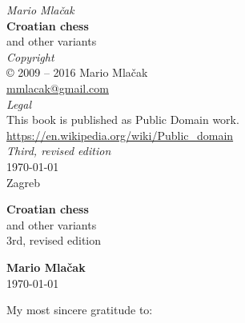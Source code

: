 \documentclass[b5paper,12pt,draft]{book}
\begin{document}
\thispagestyle{empty}
\vspace*{0.1\textheight}
\begin{center}
    \emph{Mario Mlačak} \\
    \textbf{Croatian chess} \\
    and other variants \\ [2.0em]

    \emph{Copyright} \\
    \copyright \hspace{0.2ex} 2009 -- 2016 Mario Mlačak \\
    \href{mailto:mmlacak@gmail.com}{mmlacak@gmail.com} \\ [2.0em]

    \emph{Legal} \\
    This book is published as Public Domain work. \\
    \href{https://en.wikipedia.org/wiki/Public\_domain}{https://en.wikipedia.org/wiki/Public\_domain} \\ [2.0em]

    \emph{Third, revised edition} \\
    \today \\
    Zagreb

    \vfill

    \LaTeXe
    \vspace{0.1\textheight}
\end{center}
\clearpage

\thispagestyle{empty}
\vspace*{0.2\textheight}
\begin{center}
    \textbf{\Large{Croatian chess}} \\ [1.0em]
    \large{and other variants} \\ [1.0em]
    \small{3rd, revised edition} \\ [2.0cm]
    \vspace*{0.2\textheight}

    \textbf{\large{Mario Mlačak}} \\ [1.0em]
    \small{\today} %
\end{center}
\clearpage

\thispagestyle{empty}
\vspace*{0.1\textheight}
\clearpage

\thispagestyle{empty}
\vspace*{0.2\textheight}
\hfill{My most sincere gratitude to:}
\vspace*{1.0em}
\end{document}
